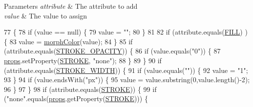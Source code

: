\begin{DoxyParams}{Parameters}
{\em attribute} & The attribute to add ~\newline
\\
\hline
{\em value} & The value to assign \\
\hline
\end{DoxyParams}

\begin{DoxyCode}
77                                                              \{
78         \textcolor{keywordflow}{if} (value == null) \{
79             value = \textcolor{stringliteral}{""};
80         \}
81         
82         \textcolor{keywordflow}{if} (attribute.equals(\mbox{\hyperlink{classorg_1_1newdawn_1_1slick_1_1svg_1_1_non_geometric_data_a100ce60b2b8dec195850716cbf3aa500}{FILL}}) ) \{
83             value = \mbox{\hyperlink{classorg_1_1newdawn_1_1slick_1_1svg_1_1_non_geometric_data_a5f09ddab2253b5bb0c3bca43b6407d41}{morphColor}}(value);
84         \}
85         \textcolor{keywordflow}{if} (attribute.equals(\mbox{\hyperlink{classorg_1_1newdawn_1_1slick_1_1svg_1_1_non_geometric_data_a5afeda15ca92e26fb0016871030ec9f6}{STROKE\_OPACITY}})) \{
86             \textcolor{keywordflow}{if} (value.equals(\textcolor{stringliteral}{"0"})) \{
87                 \mbox{\hyperlink{classorg_1_1newdawn_1_1slick_1_1svg_1_1_non_geometric_data_a75a905ff1c7bf271e32602cdc7f06191}{props}}.setProperty(\mbox{\hyperlink{classorg_1_1newdawn_1_1slick_1_1svg_1_1_non_geometric_data_a2e4170b7a30903a3789bae566a1604e4}{STROKE}}, \textcolor{stringliteral}{"none"});
88             \}
89         \}
90         \textcolor{keywordflow}{if} (attribute.equals(\mbox{\hyperlink{classorg_1_1newdawn_1_1slick_1_1svg_1_1_non_geometric_data_abe7b202a653bece82879b8108bc608bd}{STROKE\_WIDTH}})) \{
91             \textcolor{keywordflow}{if} (value.equals(\textcolor{stringliteral}{""})) \{
92                 value = \textcolor{stringliteral}{"1"};
93             \}
94             \textcolor{keywordflow}{if} (value.endsWith(\textcolor{stringliteral}{"px"})) \{
95                 value = value.substring(0,value.length()-2);
96             \}
97         \}
98         \textcolor{keywordflow}{if} (attribute.equals(\mbox{\hyperlink{classorg_1_1newdawn_1_1slick_1_1svg_1_1_non_geometric_data_a2e4170b7a30903a3789bae566a1604e4}{STROKE}})) \{
99             \textcolor{keywordflow}{if} (\textcolor{stringliteral}{"none"}.equals(\mbox{\hyperlink{classorg_1_1newdawn_1_1slick_1_1svg_1_1_non_geometric_data_a75a905ff1c7bf271e32602cdc7f06191}{props}}.getProperty(\mbox{\hyperlink{classorg_1_1newdawn_1_1slick_1_1svg_1_1_non_geometric_data_a2e4170b7a30903a3789bae566a1604e4}{STROKE}}))) \{

\end{DoxyCode}
